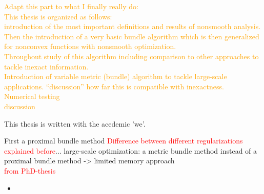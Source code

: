 \textcolor{orange}{Adapt this part to what I finally really do: \\
This thesis is organized as follows: \\
introduction of the most important definitions and results of nonsmooth analysis. Then the introduction of a very basic bundle algorithm which is then generalized for nonconvex functions with nonsmooth optimization. \\
Throughout study of this algorithm including comparison to other approaches to tackle inexact information. \\
Introduction of variable metric (bundle) algorithm to tackle large-scale applications. ``discussion'' how far this is compatible with inexactness. \\
Numerical testing \\ 
discussion}

This thesis is written with the acedemic 'we'.


First a proximal bundle method \textcolor{red}{Difference between different regularizations explained before}...
large-scale optimization: a metric bundle method instead of a proximal bundle method -> limited memory approach \\


\textcolor{red}{from PhD-thesis}
\begin{itemize}
	\item 
\end{itemize}
